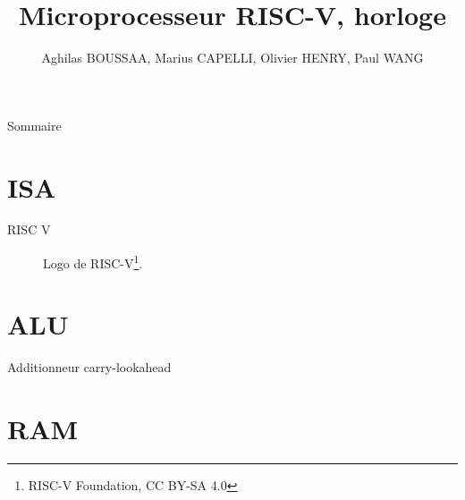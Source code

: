 \documentclass{beamer}
\title{Microprocesseur RISC-V, horloge}
\author{Aghilas BOUSSAA, Marius CAPELLI, Olivier HENRY, Paul WANG}
\begin{document}
	\maketitle
	
	\begin{frame}{Sommaire}
		\tableofcontents
	\end{frame}
	
	\section{ISA}
	
	\begin{frame}{RISC V}
		\begin{figure}
			\centering
			
			\caption{Logo de RISC-V\footnote{RISC-V Foundation, CC BY-SA 4.0}.}
		\end{figure}
		
	\end{frame}
	
	\section{ALU}
	
	\begin{frame}{Additionneur}
		carry-lookahead
	\end{frame}
	
	\section{RAM}
	
\end{document}
